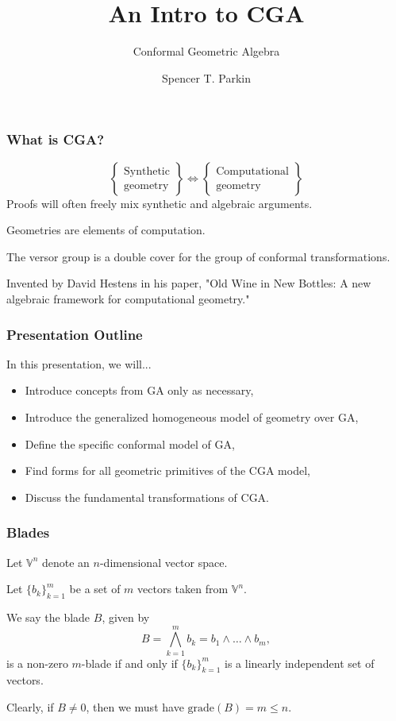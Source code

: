 \documentclass{beamer}
\title{An Intro to CGA}
\subtitle{Conformal Geometric Algebra}
\author{Spencer T. Parkin}
\institute{Avalanche Software}
\newcommand{\V}{\mathbb{V}}
\newcommand{\grade}{\mbox{grade}}
\begin{document}
\frame{\titlepage}

\begin{frame}
\frametitle{What is CGA?}
\pause
\begin{equation*}
\left\{\begin{array}{c}
\mbox{Synthetic} \\
\mbox{geometry}
\end{array}\right\}
\Longleftrightarrow
\left\{\begin{array}{c}
\mbox{Computational} \\
\mbox{geometry}
\end{array}\right\}
\end{equation*}\pause
Proofs will often freely mix synthetic and algebraic arguments.\pause

Geometries are elements of computation.\pause

The versor group is a double cover for the group of conformal transformations.\pause

Invented by \alert{David Hestens} in his paper, "Old Wine in New Bottles:
A new algebraic framework for computational geometry."
\end{frame}

\begin{frame}
\frametitle{Presentation Outline}
\pause
In this presentation, we will...\pause
\begin{itemize}
\item Introduce concepts from GA only as necessary,\pause
\item Introduce the generalized homogeneous model of geometry over GA,\pause
\item Define the specific conformal model of GA,\pause
\item Find forms for all geometric primitives of the CGA model,\pause
\item Discuss the fundamental transformations of CGA.
\end{itemize}
\end{frame}

\begin{frame}
\frametitle{Blades}
\pause
Let $\V^n$ denote an $n$-dimensional vector space.\pause

Let $\{b_k\}_{k=1}^m$ be a set of $m$ vectors taken from $\V^n$.\pause
\begin{definition}
We say the blade $B$, given by
\begin{equation*}
B = \bigwedge_{k=1}^m b_k = b_1\wedge\dots\wedge b_m,
\end{equation*}
is a non-zero $m$-blade if and only if $\{b_k\}_{k=1}^m$
is a linearly independent set of vectors.
\end{definition}\pause
Clearly, if $B\neq 0$, then we must have $\grade(B)=m\leq n$.
\end{frame}
\end{document}
